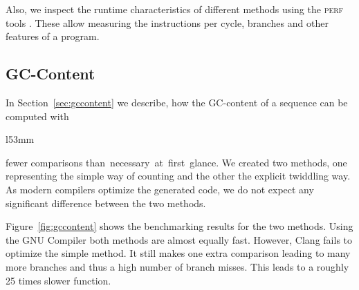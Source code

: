 \documentclass[10pt,letterpaper]{article}
\begin{document}
Also, we inspect the runtime characteristics of different methods using the \textsc{perf} tools \cite{perf}. These allow measuring the instructions per cycle, branches and other features of a program.


\subsection{GC-Content}
{
In Section~\ref{sec:gccontent} we describe, how the GC-content of a sequence can be computed with


\begin{wrapfigure}[12]{l}{53mm}
    \captionsetup{labelformat=empty} %
    \caption{}
    \label{fig:gccontent}
\end{wrapfigure}

\noindent fewer comparisons than~necessary~at~first~glance. We created two methods, one representing the simple way of counting and the other the explicit twiddling way. As modern compilers optimize the generated code, we do not expect any significant difference between the two methods.

Figure~\ref{fig:gccontent} shows the benchmarking results for the two methods. 
Using the GNU Compiler both methods are almost equally fast. However, Clang fails to optimize the simple method. It still makes one extra comparison leading to many more branches and thus a high number of branch misses. This leads to a roughly 25 times slower function.

}
\end{document}
